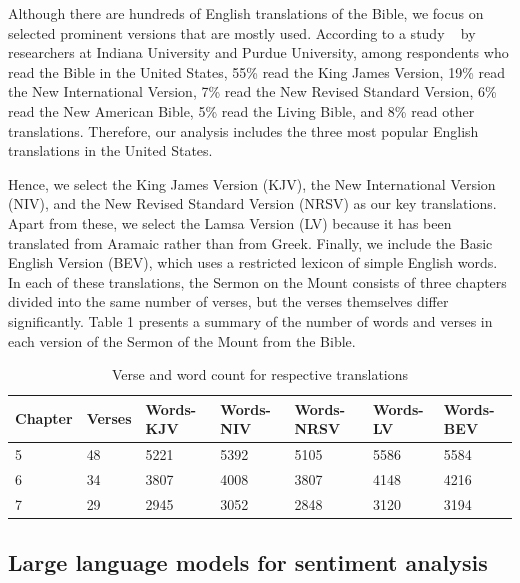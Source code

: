 \documentclass[5p,times]{elsarticle}
\begin{document}
Although there are hundreds of  English translations of the Bible, we focus on selected prominent versions that are mostly used. According to a study ~\cite{bibleinamericanlife} by researchers at Indiana University and Purdue University, among respondents who read the Bible in the United States, 55\% read the King James Version, 19\% read the New International Version, 7\% read the New Revised Standard Version, 6\% read the New American Bible, 5\% read the Living Bible, and 8\% read other translations. Therefore, our analysis includes the three most popular English translations in the United States. 

Hence, we select the King James Version (KJV), the New International Version (NIV), and the New Revised Standard Version (NRSV) as our key translations. Apart from these, we select the Lamsa Version (LV)  because it has been translated from Aramaic rather than from Greek. Finally, we include the  Basic English Version (BEV), which uses a restricted lexicon of simple English words. In each of these translations, the Sermon on the Mount consists of three chapters divided into the same number of verses, but the verses themselves differ significantly. Table  1  presents a summary of the number of words and verses in each version of the Sermon of the Mount from the Bible.
 
  


\begin{table}[htbp!]
\begin{center}
\begin{tabular}{|l|l|l|l|l|l|l|} 
\hline
 \textbf{Chapter} &  \textbf{Verses} & \textbf{Words-KJV}& \textbf{Words-NIV}& \textbf{Words-NRSV} & \textbf{Words-LV} & \textbf{Words-BEV} \\ 
 \hline
 5 &48&5221&5392&5105&5586&5584\\ 
 \hline
 6&34&3807&4008&3807&4148&4216\\ 
 \hline
 7&29&2945&3052&2848&3120&3194\\ 
 \hline
\end{tabular}
\caption{Verse and word count for respective translations}
\label{tab:word_count}
\end{center}

 
\end{table}
 
 
  
 \subsection{Large language models for  sentiment analysis }
 
\end{document}

